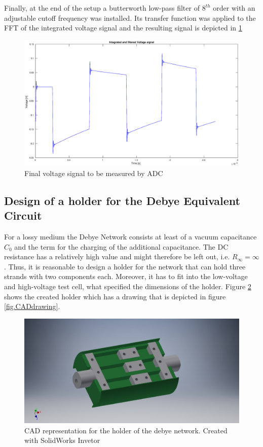 Finally, at the end of the setup a butterworth low-pass filter of $8^{th}$ order with an adjustable cutoff frequency
was installed. Its transfer function was applied to the FFT of the integrated voltage signal and the resulting 
signal is depicted in \ref{fig.finalvolt}


\begin{figure}[h!tb]
\centerline{\includegraphics[width=\textwidth]{figures/Method/signal_simulation/finalvolt.eps}}
\caption{Final voltage signal to be measured by ADC}
\label{fig.finalvolt}
\end{figure}


\subsection{Design of a holder for the Debye Equivalent Circuit}
For a lossy medium the Debye Network consists at least of a vacuum capacitance $C_0$ and the term for the charging of the additional capacitance. The DC resistance has a relatively high value and might therefore be left out, i.e. $R_{\infty}={\infty}$. Thus, it is reasonable to design a holder for the network that can hold three strands with two components each. Moreover, it has to fit into the low-voltage and high-voltage test cell, what specified the dimensions of the holder.  
Figure \ref{fig.CADgraph} shows the created holder which has a drawing that is depicted in figure \ref{fig.CADdrawing}.

\begin{figure}[h!tb]
\includegraphics[width=\textwidth]{figures/Method/CAD_MODEL/Gesamtanordnung.jpg}
\caption{CAD representation for the holder of the debye network. Created with SolidWorks Invetor}
\label{fig.CADgraph}
\end{figure}




